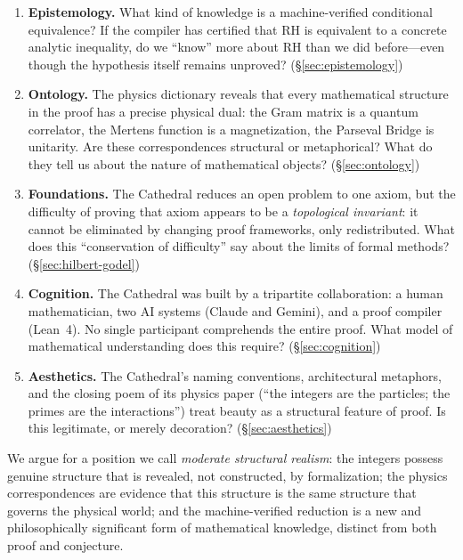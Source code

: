 \begin{enumerate}
  \item \textbf{Epistemology.} What kind of knowledge is a
    machine-verified conditional equivalence? If the compiler has
    certified that RH is equivalent to a concrete analytic inequality,
    do we ``know'' more about RH than we did before---even though
    the hypothesis itself remains unproved? (\S\ref{sec:epistemology})

  \item \textbf{Ontology.} The physics dictionary reveals that every
    mathematical structure in the proof has a precise physical dual:
    the Gram matrix is a quantum correlator, the Mertens function is
    a magnetization, the Parseval Bridge is unitarity. Are these
    correspondences structural or metaphorical? What do they tell us
    about the nature of mathematical objects?
    (\S\ref{sec:ontology})

  \item \textbf{Foundations.} The Cathedral reduces an open problem
    to one axiom, but the difficulty of proving that axiom appears
    to be a \emph{topological invariant}: it cannot be eliminated
    by changing proof frameworks, only redistributed. What does this
    ``conservation of difficulty'' say about the limits of formal
    methods? (\S\ref{sec:hilbert-godel})

  \item \textbf{Cognition.} The Cathedral was built by a tripartite
    collaboration: a human mathematician, two AI systems (Claude
    and Gemini), and a proof compiler (Lean~4). No single
    participant comprehends the entire proof. What model of
    mathematical understanding does this require?
    (\S\ref{sec:cognition})

  \item \textbf{Aesthetics.} The Cathedral's naming conventions,
    architectural metaphors, and the closing poem of its physics
    paper (``the integers are the particles; the primes are the
    interactions'') treat beauty as a structural feature of proof.
    Is this legitimate, or merely decoration?
    (\S\ref{sec:aesthetics})
\end{enumerate}

We argue for a position we call \emph{moderate structural realism}:
the integers possess genuine structure that is revealed, not
constructed, by formalization; the physics correspondences are
evidence that this structure is the same structure that governs
the physical world; and the machine-verified reduction is a new and
philosophically significant form of mathematical knowledge, distinct
from both proof and conjecture.

